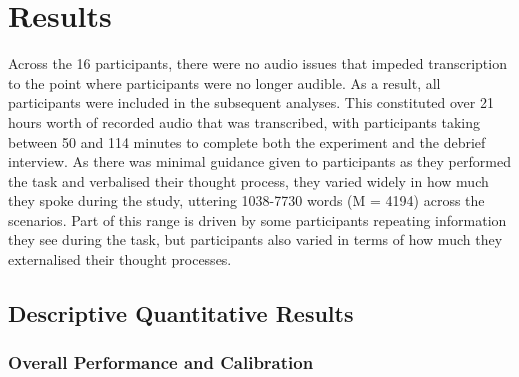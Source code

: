 \documentclass[a4paper, nobind]{templates/ociamthesis}
\begin{document}
\section{Results}\label{results-2}

Across the 16 participants, there were no audio issues that impeded transcription to the point where participants were no longer audible. As a result, all participants were included in the subsequent analyses. This constituted over 21 hours worth of recorded audio that was transcribed, with participants taking between 50 and 114 minutes to complete both the experiment and the debrief interview. As there was minimal guidance given to participants as they performed the task and verbalised their thought process, they varied widely in how much they spoke during the study, uttering 1038-7730 words (M = 4194) across the scenarios. Part of this range is driven by some participants repeating information they see during the task, but participants also varied in terms of how much they externalised their thought processes.

\subsection{Descriptive Quantitative Results}\label{descriptive-quantitative-results}

\subsubsection{Overall Performance and Calibration}\label{overall-performance-and-calibration-1}
\end{document}
